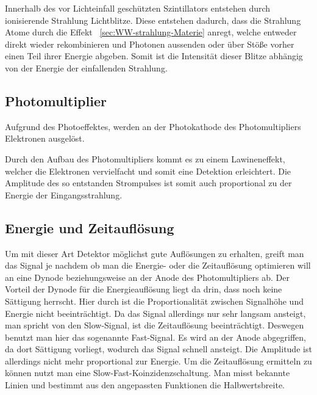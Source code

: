 \documentclass[11pt, ngerman, fleqn, DIV=15, headinclude, BCOR=2cm]{scrreprt}
\begin{document}
Innerhalb des vor Lichteinfall geschützten Szintillators entstehen durch
ionisierende Strahlung Lichtblitze. 
Diese entstehen dadurch, dass die Strahlung Atome durch die Effekt
~\ref{sec:WW-strahlung-Materie} anregt, welche entweder direkt
wieder rekombinieren und Photonen aussenden oder über Stöße vorher einen Teil
ihrer Energie abgeben.
Somit ist die Intensität dieser Blitze abhängig von der Energie der einfallenden Strahlung.



\subsection{Photomultiplier}
Aufgrund des Photoeffektes, werden an der Photokathode des Photomultipliers
Elektronen ausgelöst.

Durch den Aufbau des Photomultipliers kommt es zu einem Lawineneffekt,
welcher die Elektronen vervielfacht und somit eine Detektion erleichtert.
Die Amplitude des so entstanden Strompulses ist somit auch proportional zu der
Energie der Eingangsstrahlung.

\subsection{Energie und Zeitauflösung}
Um mit dieser Art Detektor möglichst gute Auflösungen zu erhalten, greift man
das Signal je nachdem ob man die Energie- oder die Zeitauflösung optimieren will
an eine Dynode beziehungsweise an der Anode des Photomultipliers ab.
Der Vorteil der Dynode für die Energieauflösung liegt da drin, dass noch keine
Sättigung herrscht. Hier durch ist die Proportionalität zwischen Signalhöhe und
Energie nicht beeinträchtigt. Da das Signal allerdings nur sehr langsam
ansteigt, man spricht von den Slow-Signal, ist die Zeitauflösung beeinträchtigt.
Deswegen benutzt man hier das sogenannte Fast-Signal. Es wird an der Anode
abgegriffen, da dort Sättigung vorliegt, wodurch das Signal schnell ansteigt.
Die Amplitude ist allerdings nicht mehr proportional zur Energie.
Um die Zeitauflösung ermitteln zu können nutzt man eine
Slow-Fast-Koinzidenzschaltung. Man misst bekannte Linien und bestimmt aus den
angepassten Funktionen die Halbwertsbreite.
\end{document}

